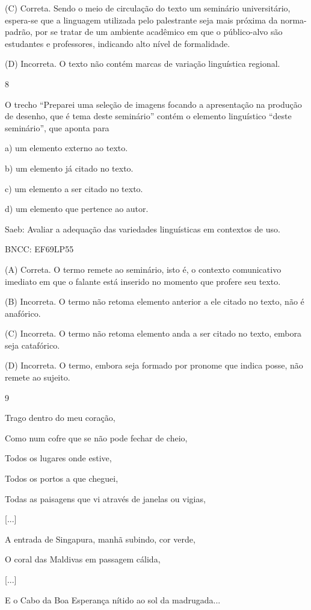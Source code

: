 (C) Correta. Sendo o meio de circulação do texto um seminário
universitário, espera-se que a linguagem utilizada pelo palestrante seja
mais próxima da norma-padrão, por se tratar de um ambiente acadêmico em
que o público-alvo são estudantes e professores, indicando alto nível de
formalidade.

(D) Incorreta. O texto não contém marcas de variação linguística
regional.

\num{8}

O trecho ``Preparei uma seleção de imagens focando a apresentação na
produção de desenho, que é tema deste seminário'' contém o elemento
linguístico ``deste seminário'', que aponta para

a) um elemento externo ao texto.

b) um elemento já citado no texto.

c) um elemento a ser citado no texto.

d) um elemento que pertence ao autor.

Saeb: Avaliar a adequação das variedades linguísticas em contextos de
uso.

BNCC: EF69LP55

(A) Correta. O termo remete ao seminário, isto é, o contexto
comunicativo imediato em que o falante está inserido no momento que
profere seu texto.

(B) Incorreta. O termo não retoma elemento anterior a ele citado no
texto, não é anafórico.

(C) Incorreta. O termo não retoma elemento anda a ser citado no texto,
embora seja catafórico.

(D) Incorreta. O termo, embora seja formado por pronome que indica
posse, não remete ao sujeito.

\num{9}

Trago dentro do meu coração,

Como num cofre que se não pode fechar de cheio,

Todos os lugares onde estive,

Todos os portos a que cheguei,

Todas as paisagens que vi através de janelas ou vigias,

{[}...{]}

A entrada de Singapura, manhã subindo, cor verde,

O coral das Maldivas em passagem cálida,

{[}...{]}

E o Cabo da Boa Esperança nítido ao sol da madrugada...

